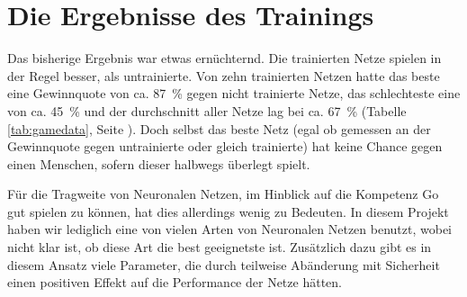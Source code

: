 \section{Die Ergebnisse des Trainings}
Das bisherige Ergebnis war etwas ernüchternd. Die trainierten Netze spielen in
der Regel besser, als untrainierte. Von zehn trainierten Netzen hatte das beste
eine Gewinnquote von ca. \SI{87}{\percent} gegen nicht trainierte Netze, das
schlechteste eine von ca. \SI{45}{\percent} und der durchschnitt aller Netze
lag bei ca. \SI{67}{\percent} (Tabelle \ref{tab:gamedata}, Seite
\pageref{tab:gamedata}).  Doch selbst das beste Netz (egal ob gemessen an der
Gewinnquote gegen untrainierte oder gleich trainierte) hat keine Chance gegen
einen Menschen, sofern dieser halbwegs überlegt spielt.

Für die Tragweite von Neuronalen Netzen, im Hinblick auf die Kompetenz Go gut
spielen zu können, hat dies allerdings wenig zu Bedeuten. In diesem Projekt
haben wir lediglich eine von vielen Arten von Neuronalen Netzen benutzt, wobei
nicht klar ist, ob diese Art die best geeignetste ist. Zusätzlich dazu gibt es
in diesem Ansatz viele Parameter, die durch teilweise Abänderung mit Sicherheit
einen positiven Effekt auf die Performance der Netze hätten. 
